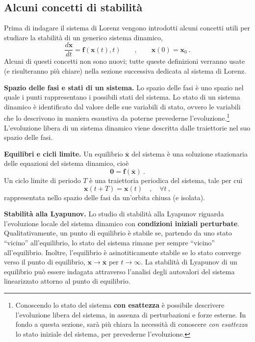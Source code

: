 \subsection{Alcuni concetti di stabilità}
Prima di indagare il sistema di Lorenz vengono introdotti alcuni concetti utili per 
 studiare la stabilità di un generico sistema dinamico,
\begin{equation}
 \dfrac{d \bm{x}}{d t } = \bm{f}(\bm{x}(t),t) \qquad , \qquad \bm{x}(0) = \bm{x}_0 \ .
\end{equation}
Alcuni di questi concetti non sono nuovi; tutte queste definizioni verranno usate 
 (e risulteranno più chiare) nella sezione successiva dedicata al sistema di Lorenz.

\vspace{0.2cm}
\noindent
\textbf{Spazio delle fasi e stati di un sistema.}
 Lo spazio delle fasi è uno spazio nel quale i punti rappresentano i possibili stati del sistema. 
 Lo stato di un sistema dinamico è identificato dal valore delle sue variabili di stato,
 ovvero le variabili che lo descrivono in maniera esaustiva da poterne prevederne
 l'evoluzione.\footnote{Conoscendo lo stato del sistema \textbf{con esattezza}
 è possibile descrivere l'evoluzione libera del sistema, in assenza di perturbazioni
 e forze esterne. In fondo a  questa sezione, sarà più chiara la necessità di conoscere
\textit{con esattezza} lo stato iniziale del sistema, per prevederne l'evoluzione.}
L'evoluzione libera di un sistema dinamico viene descritta dalle traiettorie nel suo
 spazio delle fasi.

\vspace{0.2cm}
\noindent
\textbf{Equilibri e cicli limite.} Un equilibrio $\overline{\bm{x}}$ del sistema
 è una soluzione stazionaria delle equazioni del sistema dinamico, cioè 
\begin{equation}
 \bm{0} = \bm{f}(\overline{\bm{x}}) \ .
\end{equation}
Un ciclo limite di periodo $T$ è una traiettoria periodica del sistema, tale per cui
\begin{equation}
 \bm{x}(t+T) = \bm{x}(t) \quad , \quad \forall t \ ,
\end{equation}
rappresentata nello spazio delle fasi da un'orbita chiusa (e isolata).

\vspace{0.2cm}
\noindent
\textbf{Stabilità alla Lyapunov.}
Lo studio di stabilità alla Lyapunov riguarda l'evoluzione locale del sistema dinamico
 con \textbf{condizioni iniziali perturbate}. Qualitativamente, un punto di equilibrio è stabile
 se, partendo da uno stato ``vicino'' all'equilibrio, lo stato del sistema rimane per
 sempre ``vicino'' all'equilibrio. Inoltre, l'equilibrio è asinotiticamente stabile se
 lo stato converge verso il punto di equilibrio, $\bm{x} \rightarrow \bm{\overline{x}}$
 per $t \rightarrow \infty$.
\newline
 La stabilità di Lyapunov di un equilibrio può essere
 indagata attraverso l'analisi degli autovalori del sistema linearizzato attorno al punto
 di equilibrio.

